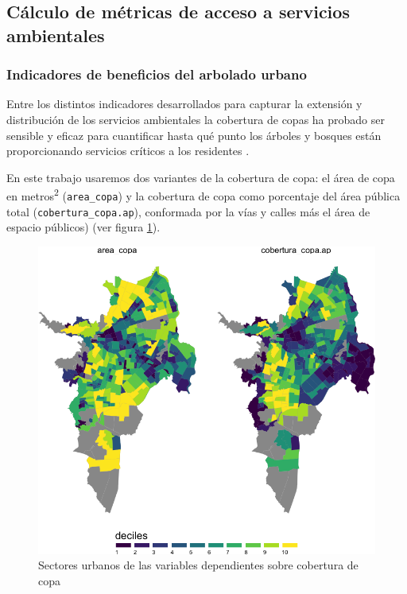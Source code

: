 \documentclass[12pt,]{book}
\begin{document}
\subsection{Cálculo de métricas de acceso a servicios
ambientales}\label{calculo-de-metricas-de-acceso-a-servicios-ambientales}

\subsubsection{Indicadores de beneficios del arbolado
urbano}\label{indicadores-de-beneficios-del-arbolado-urbano}

Entre los distintos indicadores desarrollados para capturar la extensión
y distribución de los servicios ambientales la cobertura de copas ha
probado ser sensible y eficaz para cuantificar hasta qué punto los
árboles y bosques están proporcionando servicios críticos a los
residentes \citep{nowak_sustaining_2010}.

En este trabajo usaremos dos variantes de la cobertura de copa: el área
de copa en metros\textsuperscript{2} (\texttt{area\_copa}) y la
cobertura de copa como porcentaje del área pública total
(\texttt{cobertura\_copa.ap}), conformada por la vías y calles más el
área de espacio públicos) (ver figura \ref{fig:mapa-copa-dep}).

\begin{figure}
\includegraphics[width=1\linewidth]{tesis-unigis_files/figure-latex/mapa-copa-dep-1} \caption{Sectores urbanos de las variables dependientes sobre cobertura de copa}\label{fig:mapa-copa-dep}
\end{figure}
\end{document}
